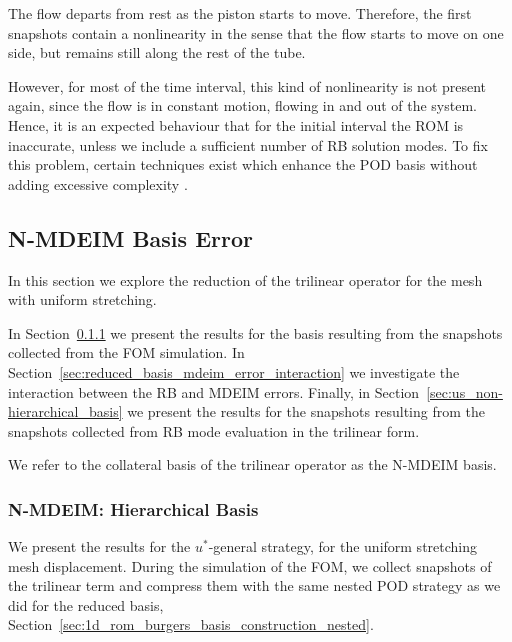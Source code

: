 \documentclass[../../thesis.tex]{subfiles}
\begin{document}
The flow departs from rest as the piston starts to move.
Therefore, the first snapshots contain a nonlinearity in the sense that the flow starts to move on one side, 
but remains still along the rest of the tube.

However, for most of the time interval, 
this kind of nonlinearity is not present again,
since the flow is in constant motion, flowing in and out of the system.
Hence, it is an expected behaviour that for the initial interval the ROM is inaccurate,
unless we include a sufficient number of RB solution modes.
To fix this problem, certain techniques exist which enhance the POD basis 
without adding excessive complexity \cite{weightedPOD}.

\newpage
\subsection{N-MDEIM Basis Error}
\label{sec:uniform_mdeim_errors}
In this section we explore the reduction of the trilinear operator
for the mesh with uniform stretching.

In Section~\ref{sec:us_hierarchical_basis} we present the results for
the basis resulting from the snapshots collected from the FOM simulation.
In Section~\ref{sec:reduced_basis_mdeim_error_interaction} we investigate
the interaction between the RB and MDEIM errors.
Finally, in Section~\ref{sec:us_non-hierarchical_basis} we present the results for
the snapshots resulting from the snapshots collected from RB mode evaluation
in the trilinear form.

We refer to the collateral basis of the trilinear operator as the N-MDEIM basis.

\subsubsection{N-MDEIM: Hierarchical Basis}
\label{sec:us_hierarchical_basis}
We present the results for the \mbox{$u^{*}$-general} strategy,
for the uniform stretching mesh displacement.
During the simulation of the FOM, 
we collect snapshots of the trilinear term and compress them with the same  
nested POD strategy as we did for the reduced basis, 
Section~\ref{sec:1d_rom_burgers_basis_construction_nested}.
\end{document}
